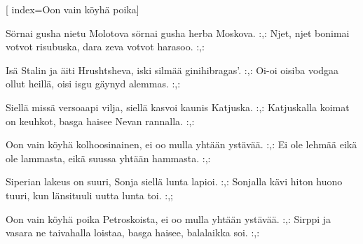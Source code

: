 [ 										
	index={Oon vain köyhä poika}]		
	
\beginverse*						
Sörnai gusha nietu Molotova
sörnai gusha herba Moskova.
:,: Njet, njet bonimai votvot risubuska,
dara zeva votvot harasoo. :,:
\endverse

\beginverse				
Isä Stalin ja äiti Hrushtsheva,
iski silmää ginihibragas’.
:,: Oi-oi oisiba vodgaa ollut heillä,
oisi isgu gäynyd alemmas. :,:
\endverse

\beginverse
Siellä missä versoaapi vilja, 
siellä kasvoi kaunis Katjuska.
:,: Katjuskalla koimat on keuhkot,
basga haisee Nevan rannalla. :,:
\endverse

\beginverse
Oon vain köyhä kolhoosinainen,
ei oo mulla yhtään ystävää.
:,: Ei ole lehmää eikä ole lammasta,
eikä suussa yhtään hammasta. :,:
\endverse

\beginverse
Siperian lakeus on suuri,
Sonja siellä lunta lapioi.
:,: Sonjalla kävi hiton huono tuuri,
kun länsituuli uutta lunta toi. :,;
\endverse

\beginverse
Oon vain köyhä poika Petroskoista,
ei oo mulla yhtään ystävää. 
:,: Sirppi ja vasara ne taivahalla loistaa,
basga haisee, balalaikka soi. :,:
\endverse		
\endsong		
